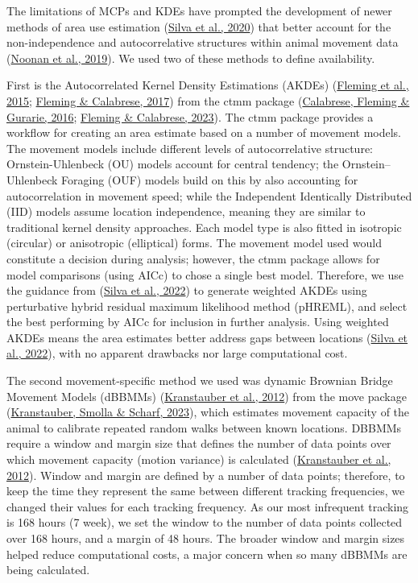 \documentclass[10pt,a4paper]{article}
\begin{document}
The limitations of MCPs and KDEs have prompted the development of newer methods of area use estimation (\protect\hyperlink{ref-silva_reptiles_2020}{Silva et al., 2020}) that better account for the non-independence and autocorrelative structures within animal movement data (\protect\hyperlink{ref-Noonan2018}{Noonan et al., 2019}).
We used two of these methods to define availability.

First is the Autocorrelated Kernel Density Estimations (AKDEs) (\protect\hyperlink{ref-Fleming2015}{Fleming et al., 2015}; \protect\hyperlink{ref-Fleming2017}{Fleming \& Calabrese, 2017}) from the ctmm package (\protect\hyperlink{ref-Calabrese2016}{Calabrese, Fleming \& Gurarie, 2016}; \protect\hyperlink{ref-ctmm}{Fleming \& Calabrese, 2023}).
The ctmm package provides a workflow for creating an area estimate based on a number of movement models.
The movement models include different levels of autocorrelative structure: Ornstein-Uhlenbeck (OU) models account for central tendency; the Ornstein--Uhlenbeck Foraging (OUF) models build on this by also accounting for autocorrelation in movement speed; while the Independent Identically Distributed (IID) models assume location independence, meaning they are similar to traditional kernel density approaches.
Each model type is also fitted in isotropic (circular) or anisotropic (elliptical) forms.
The movement model used would constitute a decision during analysis; however, the ctmm package allows for model comparisons (using AICc) to chose a single best model.
Therefore, we use the guidance from (\protect\hyperlink{ref-silva_autocorrelationinformed_2022}{Silva et al., 2022}) to generate weighted AKDEs using perturbative hybrid residual maximum likelihood method (pHREML), and select the best performing by AICc for inclusion in further analysis.
Using weighted AKDEs means the area estimates better address gaps between locations (\protect\hyperlink{ref-silva_autocorrelationinformed_2022}{Silva et al., 2022}), with no apparent drawbacks nor large computational cost.

The second movement-specific method we used was dynamic Brownian Bridge Movement Models (dBBMMs) (\protect\hyperlink{ref-Kranstauber2012}{Kranstauber et al., 2012}) from the move package (\protect\hyperlink{ref-move}{Kranstauber, Smolla \& Scharf, 2023}), which estimates movement capacity of the animal to calibrate repeated random walks between known locations.
DBBMMs require a window and margin size that defines the number of data points over which movement capacity (motion variance) is calculated (\protect\hyperlink{ref-Kranstauber2012}{Kranstauber et al., 2012}).
Window and margin are defined by a number of data points; therefore, to keep the time they represent the same between different tracking frequencies, we changed their values for each tracking frequency.
As our most infrequent tracking is 168 hours (7 week), we set the window to the number of data points collected over 168 hours, and a margin of 48 hours.
The broader window and margin sizes helped reduce computational costs, a major concern when so many dBBMMs are being calculated.
\end{document}

